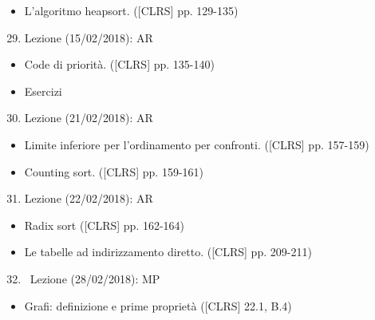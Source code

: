 \documentclass{article}
\providecommand{\tightlist}{%
  \setlength{\itemsep}{0pt}\setlength{\parskip}{0pt}}
\begin{document}
\begin{itemize}
\tightlist
\item
  {L'algoritmo heapsort. ({[}CLRS{]} pp. 129-135)}
\end{itemize}

\begin{enumerate}
\setcounter{enumi}{28}
\tightlist
\item
  {Lezione (15/02/2018): AR}
\end{enumerate}

\begin{itemize}
\tightlist
\item
  {Code di priorità. ({[}CLRS{]} pp. 135-140)}
\item
  {Esercizi}
\end{itemize}

\begin{enumerate}
\setcounter{enumi}{29}
\tightlist
\item
  {Lezione (21/02/2018): AR}
\end{enumerate}

\begin{itemize}
\tightlist
\item
  {Limite inferiore per l'ordinamento per confronti. ({[}CLRS{]} pp.
  157-159)}
\item
  {Counting sort. ({[}CLRS{]} pp. 159-161)}
\end{itemize}

\begin{enumerate}
\setcounter{enumi}{30}
\tightlist
\item
  {Lezione (22/02/2018): AR}
\end{enumerate}

\begin{itemize}
\tightlist
\item
  {Radix sort ({[}CLRS{]} pp. 162-164)}
\item
  {Le tabelle ad indirizzamento diretto. ({[}CLRS{]} pp.
  209-211)}
\end{itemize}

\begin{enumerate}
\setcounter{enumi}{31}
\tightlist
\item
  {~Lezione (28/02/2018): MP}
\end{enumerate}

\begin{itemize}
\tightlist
\item
  {Grafi: definizione e prime proprietà ({[}CLRS{]} 22.1, B.4)}
\end{itemize}
\end{document}
